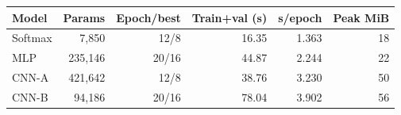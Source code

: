 \begin{tabular}{lrrrrr}
\toprule
Model & Params & Epoch/best & Train+val (s) & s/epoch & Peak MiB\\
\midrule
Softmax & 7,850 & 12/8 & 16.35 & 1.363 & 18\\
MLP & 235,146 & 20/16 & 44.87 & 2.244 & 22\\
CNN-A & 421,642 & 12/8 & 38.76 & 3.230 & 50\\
CNN-B & 94,186 & 20/16 & 78.04 & 3.902 & 56\\
\bottomrule
\end{tabular}
